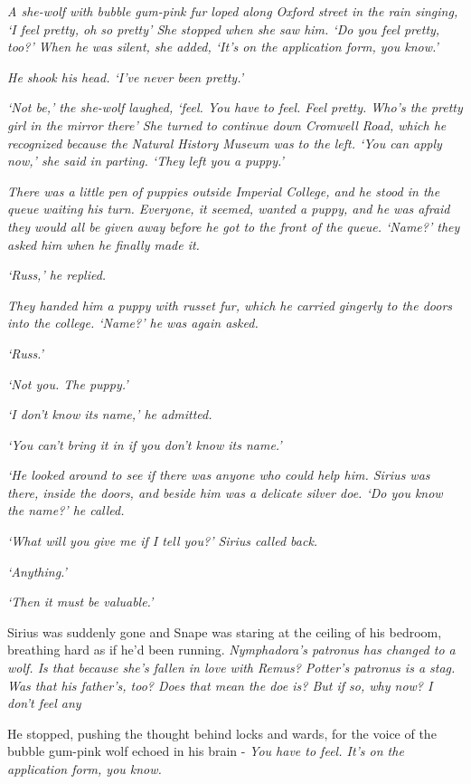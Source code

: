 \sbreak

\emph{A she-wolf with bubble gum-pink fur loped along Oxford street in the rain singing, `I feel pretty, oh so pretty{\el}' She stopped when she saw him. `Do you feel pretty, too?' When he was silent, she added, `It's on the application form, you know.'}

\emph{He shook his head. `I've never been pretty.'}

\emph{`Not be,' the she-wolf laughed, `feel. You have to feel. Feel pretty. Who's the pretty girl in the mirror there{\el}' She turned to continue down Cromwell Road, which he recognized because the Natural History Museum was to the left. `You can apply now,' she said in parting. `They left you a puppy.'}

\emph{There was a little pen of puppies outside Imperial College, and he stood in the queue waiting his turn. Everyone, it seemed, wanted a puppy, and he was afraid they would all be given away before he got to the front of the queue. `Name?' they asked him when he finally made it.}

\emph{`Russ,' he replied.}

\emph{They handed him a puppy with russet fur, which he carried gingerly to the doors into the college. `Name?' he was again asked.}

\emph{`Russ.'}

\emph{`Not you. The puppy.'}

\emph{`I don't know its name,' he admitted.}

\emph{`You can't bring it in if you don't know its name.'}

\emph{`He looked around to see if there was anyone who could help him. Sirius was there, inside the doors, and beside him was a delicate silver doe. `Do you know the name?' he called.}

\emph{`What will you give me if I tell you?' Sirius called back.}

\emph{`Anything.'}

\emph{`Then it must be valuable.'}

Sirius was suddenly gone and Snape was staring at the ceiling of his bedroom, breathing hard as if he'd been running. \emph{Nymphadora's patronus has changed to a wolf. Is that because she's fallen in love with Remus? Potter's patronus is a stag. Was that his father's, too? Does that mean the doe is{\el}? But if so, why now? I don't feel any{\el}}

He stopped, pushing the thought behind locks and wards, for the voice of the bubble gum-pink wolf echoed in his brain - \emph{You have to feel. It's on the application form, you know.} 


